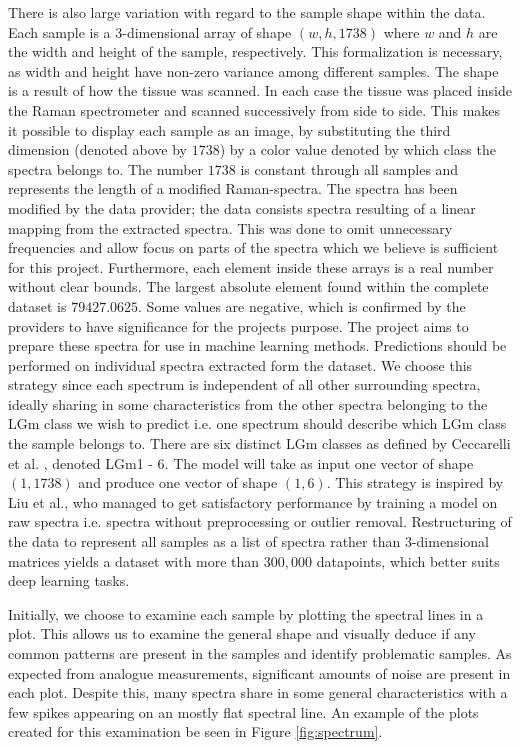 There is also large variation with regard to the sample shape within the data. Each sample is a 3-dimensional array of shape $(w, h, 1738)$ where $w$ and $h$ are the width and height of the sample, respectively. This formalization is necessary, as width and height have non-zero variance among different samples. The shape is a result of how the tissue was scanned. In each case the tissue was placed inside the Raman spectrometer and scanned successively from side to side. This makes it possible to display each sample as an image, by substituting the third dimension (denoted above by $1738$) by a color value denoted by which class the spectra belongs to. The number $1738$ is constant through all samples and represents the length of a modified Raman-spectra. The spectra has been modified by the data provider; the data consists spectra resulting of a linear mapping from the extracted spectra. This was done to omit unnecessary frequencies and allow focus on parts of the spectra which we believe is sufficient for this project. Furthermore, each element inside these arrays is a real number without clear bounds. The largest absolute element found within the complete dataset is $79427.0625$. Some values are negative, which is confirmed by the providers to have significance for the projects purpose. The project aims to prepare these spectra for use in machine learning methods. Predictions should be performed on individual spectra extracted form the dataset. We choose this strategy since each spectrum is independent of all other surrounding spectra, ideally sharing in some characteristics from the other spectra belonging to the LGm class we wish to predict i.e. one spectrum should describe which LGm class the sample belongs to. There are six distinct LGm classes as defined by Ceccarelli et al. \cite{cellsubsets}, denoted LGm1 - 6. The model will take as input one vector of shape $(1, 1738)$ and produce one vector of shape $(1, 6)$. This strategy is inspired by Liu et al.\cite{liu2017deep}, who managed to get satisfactory performance by training a model on raw spectra i.e. spectra without preprocessing or outlier removal. Restructuring of the data to represent all samples as a list of spectra rather than 3-dimensional matrices yields a dataset with more than $300,000$ datapoints, which better suits deep learning tasks.


Initially, we choose to examine each sample by plotting the spectral lines in a plot. This allows us to examine the general shape and visually deduce if any common patterns are present in the samples and identify problematic samples. As expected from analogue measurements, significant amounts of noise are present in each plot. Despite this, many spectra share in some general characteristics with a few spikes appearing on an mostly flat spectral line. An example of the plots created for this examination be seen in Figure \ref{fig:spectrum}.

